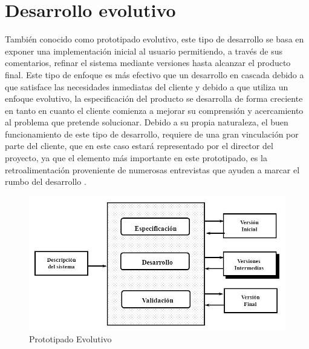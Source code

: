 \section{Desarrollo evolutivo}
\label{section:desarrollo}
También conocido como prototipado evolutivo, este tipo de desarrollo se basa en exponer una implementación inicial al usuario permitiendo, a través de sus comentarios, refinar el sistema mediante versiones hasta alcanzar el producto final.
Este tipo de enfoque es más efectivo que un desarrollo en cascada debido a que satisface las necesidades inmediatas del cliente y debido a que utiliza un enfoque evolutivo, la especificación del producto se desarrolla de forma creciente en tanto en cuanto el cliente comienza a mejorar su comprensión y acercamiento al problema que pretende solucionar.
Debido a su propia naturaleza, el buen funcionamiento de este tipo de desarrollo, requiere de una gran vinculación por parte del cliente, que en este caso estará representado por el director del proyecto, ya que el elemento más importante en este prototipado, es la retroalimentación proveniente de numerosas entrevistas que ayuden a marcar el rumbo del desarrollo \cite{Somm06}.

\begin{figure}[H]
\centering
\includegraphics[width=120mm, fbox={\fboxrule} 4mm]{images/04-metodo/01-protipado_evolutivo.jpg}
\caption{Prototipado Evolutivo}
\label{fig:prototipado_evolutivo}
\end{figure}

